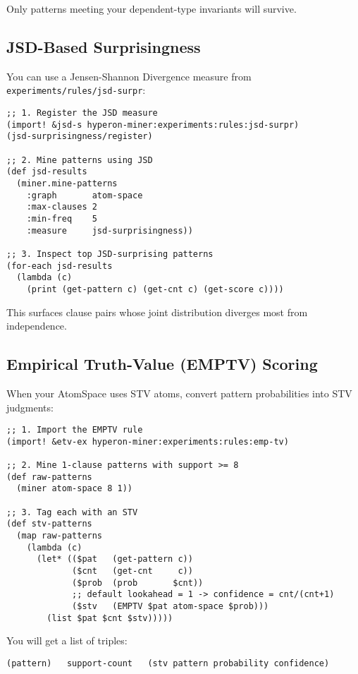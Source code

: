 \documentclass{article}
\begin{document}
Only patterns meeting your dependent-type invariants will survive.

\subsection{JSD-Based Surprisingness}

You can use a Jensen-Shannon Divergence measure from \texttt{experiments/rules/jsd-surpr}:

\begin{verbatim}
;; 1. Register the JSD measure
(import! &jsd-s hyperon-miner:experiments:rules:jsd-surpr)
(jsd-surprisingness/register)

;; 2. Mine patterns using JSD
(def jsd-results
  (miner.mine-patterns
    :graph       atom-space
    :max-clauses 2
    :min-freq    5
    :measure     jsd-surprisingness))

;; 3. Inspect top JSD-surprising patterns
(for-each jsd-results
  (lambda (c)
    (print (get-pattern c) (get-cnt c) (get-score c))))
\end{verbatim}

This surfaces clause pairs whose joint distribution diverges most from independence.

\subsection{Empirical Truth-Value (EMPTV) Scoring}

When your AtomSpace uses STV atoms, convert pattern probabilities into STV judgments:

\begin{verbatim}
;; 1. Import the EMPTV rule
(import! &etv-ex hyperon-miner:experiments:rules:emp-tv)

;; 2. Mine 1-clause patterns with support >= 8
(def raw-patterns
  (miner atom-space 8 1))

;; 3. Tag each with an STV
(def stv-patterns
  (map raw-patterns
    (lambda (c)
      (let* (($pat   (get-pattern c))
             ($cnt   (get-cnt     c))
             ($prob  (prob       $cnt))
             ;; default lookahead = 1 -> confidence = cnt/(cnt+1)
             ($stv   (EMPTV $pat atom-space $prob)))
        (list $pat $cnt $stv)))))
\end{verbatim}

You will get a list of triples:

\begin{verbatim}
(pattern)   support-count   (stv pattern probability confidence)
\end{verbatim}
\end{document}
